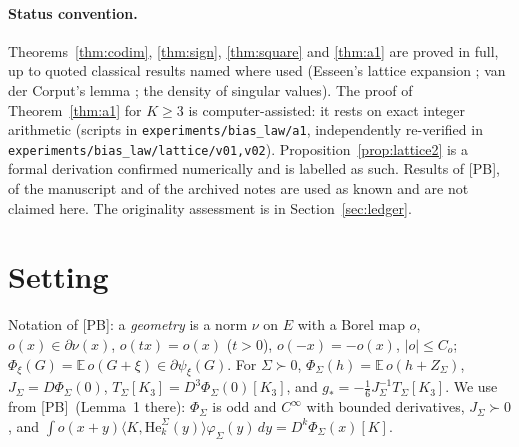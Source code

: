 \documentclass[10pt]{article}
\theoremstyle{definition}
\theoremstyle{remark}
\newcommand{\E}{\mathbb{E}}
\newcommand{\inner}[2]{\langle #1, #2\rangle}
\newcommand{\He}{\mathrm{He}}
\newcommand{\PB}{\textup{[PB]}}
\begin{document}
\paragraph{Status convention.} Theorems~\ref{thm:codim}, \ref{thm:sign}, \ref{thm:square} and \ref{thm:a1} are proved in
full, up to quoted classical results named where used (Esseen's lattice expansion \cite{esseen,gk}; van der Corput's
lemma \cite{stein}; the density of singular values). The proof of Theorem~\ref{thm:a1} for $K\ge3$ is
computer-assisted: it rests on exact integer arithmetic (scripts in \texttt{experiments/bias\_law/a1}, independently re-verified in
\texttt{experiments/bias\_law/lattice/v01,v02}). Proposition~\ref{prop:lattice2} is a formal derivation confirmed numerically and is
labelled as such. Results of \PB, of the manuscript \cite{manuscript} and of the archived notes are used as known and
are not claimed here. The originality assessment is in Section~\ref{sec:ledger}.

\section{Setting}\label{sec:setting}

Notation of \PB: a \emph{geometry} is a norm $\nu$ on $E$ with a Borel map $o$, $o(x)\in\partial\nu(x)$,
$o(tx)=o(x)$ ($t>0$), $o(-x)=-o(x)$, $|o|\le C_o$; $\Phi_\xi(G)=\E\,o(G+\xi)\in\partial\psi_\xi(G)$. For $\Sigma\succ0$,
$\Phi_\Sigma(h)=\E\,o(h+Z_\Sigma)$, $J_\Sigma=D\Phi_\Sigma(0)$, $T_\Sigma[K_3]=D^3\Phi_\Sigma(0)[K_3]$, and
$g_\ast=-\frac16J_\Sigma^{-1}T_\Sigma[K_3]$. We use from \PB\ (Lemma~1 there): $\Phi_\Sigma$ is odd and $C^\infty$ with
bounded derivatives, $J_\Sigma\succ0$, and $\int o(x+y)\inner{K}{\He^\Sigma_k(y)}\varphi_\Sigma(y)\,dy=D^k\Phi_\Sigma(x)[K]$.
\end{document}
